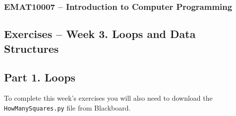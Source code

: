 \documentclass[11pt]{report}
\begin{document}
\subsubsection*{EMAT10007 -- Introduction to Computer Programming}
\subsection*{\Large Exercises -- Week 3. Loops and Data Structures}

\subsection*{\Large Part 1. Loops}
To complete this week's exercises you will also need to download the {\tt HowManySquares.py} file from Blackboard.
\end{document}
